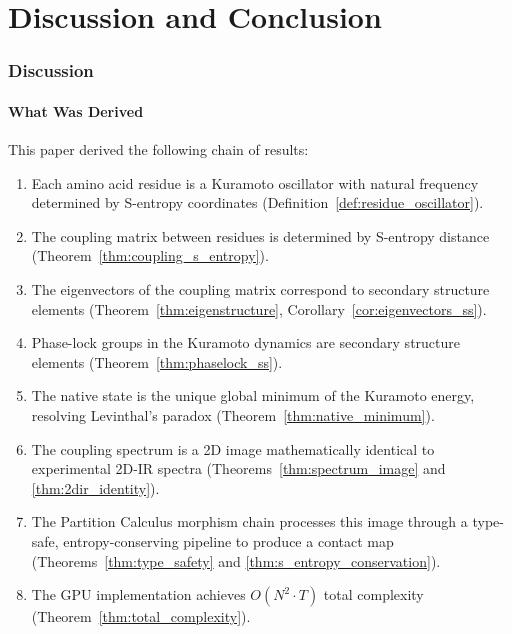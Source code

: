 \documentclass[11pt,twocolumn,a4paper]{article}
\theoremstyle{definition}
\theoremstyle{remark}
\begin{document}
\part{Discussion and Conclusion}

\section{Discussion}
\label{sec:discussion}

\subsection{What Was Derived}

This paper derived the following chain of results:

\begin{enumerate}
    \item Each amino acid residue is a Kuramoto oscillator with natural frequency determined by S-entropy coordinates (Definition~\ref{def:residue_oscillator}).
    \item The coupling matrix between residues is determined by S-entropy distance (Theorem~\ref{thm:coupling_s_entropy}).
    \item The eigenvectors of the coupling matrix correspond to secondary structure elements (Theorem~\ref{thm:eigenstructure}, Corollary~\ref{cor:eigenvectors_ss}).
    \item Phase-lock groups in the Kuramoto dynamics are secondary structure elements (Theorem~\ref{thm:phaselock_ss}).
    \item The native state is the unique global minimum of the Kuramoto energy, resolving Levinthal's paradox (Theorem~\ref{thm:native_minimum}).
    \item The coupling spectrum is a 2D image mathematically identical to experimental 2D-IR spectra (Theorems~\ref{thm:spectrum_image} and \ref{thm:2dir_identity}).
    \item The Partition Calculus morphism chain processes this image through a type-safe, entropy-conserving pipeline to produce a contact map (Theorems~\ref{thm:type_safety} and \ref{thm:s_entropy_conservation}).
    \item The GPU implementation achieves $O(N^2 \cdot T)$ total complexity (Theorem~\ref{thm:total_complexity}).
\end{enumerate}
\end{document}
